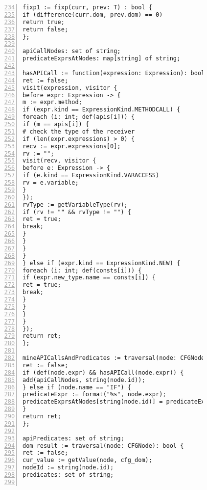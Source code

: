 \begin{figure}[ht!]
\begin{lstlisting}[numbers=left, tabsize=4, escapechar=@, caption={API Precondition Mining Analysis},label={lst:apm-code}, firstline = 234, firstnumber = 234, lastline = 295]
fixp1 := fixp(curr, prev: T) : bool {
if (difference(curr.dom, prev.dom) == 0)
return true;	
return false;
};

apiCallNodes: set of string;
predicateExprsAtNodes: map[string] of string;

hasAPICall := function(expression: Expression): bool {
ret := false;
visit(expression, visitor {
before expr: Expression -> {
m := expr.method;
if (expr.kind == ExpressionKind.METHODCALL) {
foreach (i: int; def(apis[i])) {
if (m == apis[i]) {
# check the type of the receiver
if (len(expr.expressions) > 0) {
recv := expr.expressions[0];
rv := "";
visit(recv, visitor {
before e: Expression -> {
if (e.kind == ExpressionKind.VARACCESS) 
rv = e.variable;
}
});
rvType := getVariableType(rv);
if (rv != "" && rvType != "") {
ret = true;
break;
}
}
}
} 
} else if (expr.kind == ExpressionKind.NEW) {
foreach (i: int; def(consts[i])) {
if (expr.new_type.name == consts[i]) {
ret = true;
break;
}
}
}
}
});
return ret;
};

mineAPICallsAndPredicates := traversal(node: CFGNode): bool { 
ret := false;
if (def(node.expr) && hasAPICall(node.expr)) {
add(apiCallNodes, string(node.id));
} else if (node.name == "IF") {
predicateExpr := format("%s", node.expr);
predicateExprsAtNodes[string(node.id)] = predicateExpr;
}
return ret;
};

apiPredicates: set of string;
dom_result := traversal(node: CFGNode): bool {
ret := false;
cur_value := getValue(node, cfg_dom);
nodeId := string(node.id);
predicates: set of string;


\end{lstlisting}
\end{figure}
